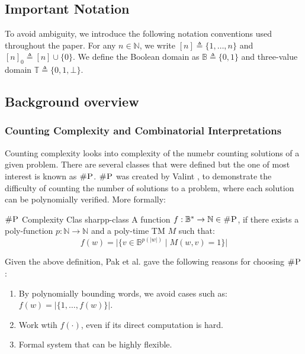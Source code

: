 
\subsection{Important Notation}

To avoid ambiguity, we introduce the following notation conventions used throughout the paper.
For any $n \in \mathbb{N}$, we write $[n] \triangleq \{1, \ldots, n\}$  and $[n]_0 \triangleq [n] \cup \{0\}$. 
We define the Boolean domain as $\mathbb{B} \triangleq \{0, 1\}$ and
three-value domain $\mathbb{T} \triangleq \{0, 1, \bot\}$.


\subsection{Background overview}


\subsubsection{Counting Complexity and Combinatorial Interpretations}

Counting complexity looks into complexity of the numebr counting solutions
of a given problem. There are several classes that were defined but the one
of most interest is known as  $\textsc{\#P}$.
$\textsc{\#P}$ was created by Valint \cite{valiant_ComplexityComputingPermanent_1979},
to demonstrate the difficulty of counting the number of solutions to a problem,
where each solution can be polynomially verified. More formally:

\begin{definitionbox}{$\textsc{\#P}$ Complexity Clas \cite{valiant_ComplexityComputingPermanent_1979}}{sharpp-class}
    A function $f: \mathbb{B}^* \to \mathbb{N} \in \textsc{\#P}$, if there exists a
    poly-function $p : \mathbb{N} \to \mathbb{N}$ and a poly-time TM $M$ such that:
    $$
    f(w) = \Big|\Big\{v \in \mathbb{B}^{p(|w|)} \mid M(w, v) =1 \Big\}\Big|
    $$
\end{definitionbox}

Given the above definition, Pak et al. \cite{pak_WhatCombinatorialInterpretation_2022, ikenmeyer_PositivitySymmetricGroup_2024} 
gave the following reasons for choosing $\textsc{\#P}$:

\begin{enumerate}
    \item By polynomially bounding words, we avoid cases such as: $f(w) = |\{1, \hdots, f(w)\}|$.
    \item Work wtih $f(\cdot)$, even if its direct computation is hard.
    \item Formal system that can be highly flexible.
\end{enumerate}


